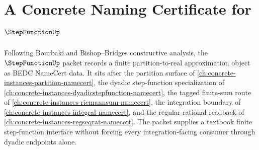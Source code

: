 \chapter{A Concrete Naming Certificate for $\StepFunctionUp$}
\label{ch:concrete-instances-step-function-namecert}

Following Bourbaki and Bishop--Bridges constructive analysis, the $\StepFunctionUp$ packet records a finite partition-to-real approximation object as BEDC NameCert data. It sits after the partition surface of \autoref{ch:concrete-instances-partition-namecert}, the dyadic step-function specialization of \autoref{ch:concrete-instances-dyadicstepfunction-namecert}, the tagged finite-sum route of \autoref{ch:concrete-instances-riemannsum-namecert}, the integration boundary of \autoref{ch:concrete-instances-integral-namecert}, and the regular rational readback of \autoref{ch:concrete-instances-regseqrat-namecert}. The packet supplies a textbook finite step-function interface without forcing every integration-facing consumer through dyadic endpoints alone.

